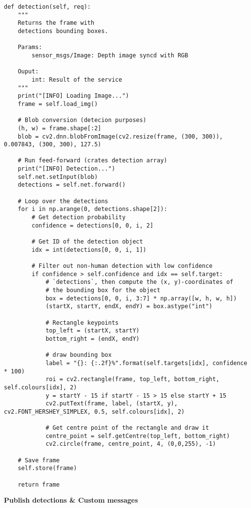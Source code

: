\begin{lstlisting}
def detection(self, req):
	"""
    Returns the frame with
    detections bounding boxes.

    Params:
    	sensor_msgs/Image: Depth image syncd with RGB

    Ouput:
    	int: Result of the service
	"""
    print("[INFO] Loading Image...")
    frame = self.load_img()

    # Blob conversion (detecion purposes)
    (h, w) = frame.shape[:2]
    blob = cv2.dnn.blobFromImage(cv2.resize(frame, (300, 300)), 0.007843, (300, 300), 127.5)

    # Run feed-forward (crates detection array)
    print("[INFO] Detection...")
    self.net.setInput(blob)
    detections = self.net.forward()

    # Loop over the detections
    for i in np.arange(0, detections.shape[2]):
    	# Get detection probability
        confidence = detections[0, 0, i, 2]

        # Get ID of the detection object
        idx = int(detections[0, 0, i, 1])

        # Filter out non-human detection with low confidence
        if confidence > self.confidence and idx == self.target:
        	# `detections`, then compute the (x, y)-coordinates of
            # the bounding box for the object
            box = detections[0, 0, i, 3:7] * np.array([w, h, w, h])
            (startX, startY, endX, endY) = box.astype("int")

            # Rectangle keypoints
            top_left = (startX, startY)
            bottom_right = (endX, endY)

            # draw bounding box
            label = "{}: {:.2f}%".format(self.targets[idx], confidence * 100)
            roi = cv2.rectangle(frame, top_left, bottom_right, self.colours[idx], 2)
            y = startY - 15 if startY - 15 > 15 else startY + 15
            cv2.putText(frame, label, (startX, y), cv2.FONT_HERSHEY_SIMPLEX, 0.5, self.colours[idx], 2)

            # Get centre point of the rectangle and draw it
            centre_point = self.getCentre(top_left, bottom_right)
            cv2.circle(frame, centre_point, 4, (0,0,255), -1)

	# Save frame
    self.store(frame)

    return frame
\end{lstlisting}

\textbf{Publish detections \& Custom messages}

